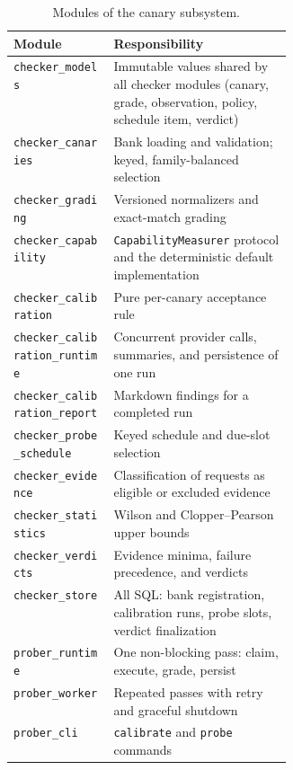 \begin{table}[htbp]
  \centering
  \small
  \begin{tabularx}{\linewidth}{@{}p{0.36\linewidth}X@{}}
    \toprule
    Module & Responsibility \\
    \midrule
    \texttt{checker\_models} & Immutable values shared by all checker modules
      (canary, grade, observation, policy, schedule item, verdict) \\
    \texttt{checker\_canaries} & Bank loading and validation; keyed,
      family-balanced selection \\
    \texttt{checker\_grading} & Versioned normalizers and exact-match grading \\
    \texttt{checker\_capability} & \texttt{CapabilityMeasurer} protocol and the
      deterministic default implementation \\
    \texttt{checker\_calibration} & Pure per-canary acceptance rule \\
    \texttt{checker\_calibration\_runtime} & Concurrent provider calls,
      summaries, and persistence of one run \\
    \texttt{checker\_calibration\_report} & Markdown findings for a completed
      run \\
    \texttt{checker\_probe\_schedule} & Keyed schedule and due-slot selection \\
    \texttt{checker\_evidence} & Classification of requests as eligible or
      excluded evidence \\
    \texttt{checker\_statistics} & Wilson and Clopper--Pearson upper bounds \\
    \texttt{checker\_verdicts} & Evidence minima, failure precedence, and
      verdicts \\
    \texttt{checker\_store} & All SQL: bank registration, calibration runs,
      probe slots, verdict finalization \\
    \texttt{prober\_runtime} & One non-blocking pass: claim, execute, grade,
      persist \\
    \texttt{prober\_worker} & Repeated passes with retry and graceful shutdown
      \\
    \texttt{prober\_cli} & \texttt{calibrate} and \texttt{probe} commands \\
    \bottomrule
  \end{tabularx}
  \caption{Modules of the canary subsystem.}
  \label{tab:modules}
\end{table}

